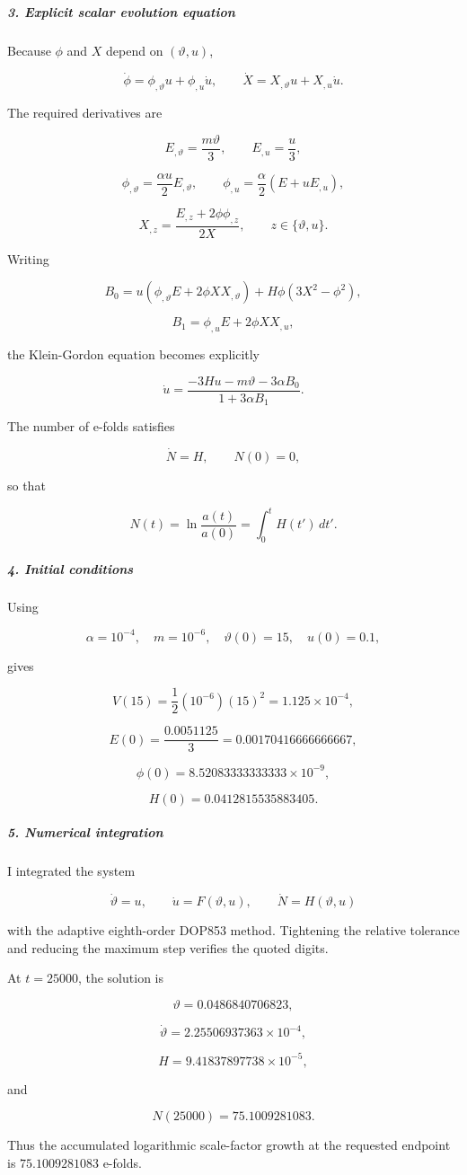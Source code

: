 \subparagraph*{3. Explicit scalar evolution equation}

Because $\phi$ and $X$ depend on $(\vartheta,u)$,

\[
\dot\phi=\phi_{,\vartheta}u+\phi_{,u}\dot u, \qquad \dot X=X_{,\vartheta}u+X_{,u}\dot u.
\]

The required derivatives are

\[
E_{,\vartheta}=\frac{m\vartheta}{3}, \qquad E_{,u}=\frac{u}{3},
\]

\[
\phi_{,\vartheta} = \frac{\alpha u}{2}E_{,\vartheta}, \qquad \phi_{,u} = \frac{\alpha}{2}\left(E+uE_{,u}\right),
\]

\[
X_{,z} = \frac{E_{,z}+2\phi\phi_{,z}}{2X}, \qquad z\in\{\vartheta,u\}.
\]

Writing

\[
B_0 = u\left(\phi_{,\vartheta}E+2\phi X X_{,\vartheta}\right) + H\phi(3X^2-\phi^2),
\]

\[
B_1 = \phi_{,u}E+2\phi X X_{,u},
\]

the Klein-Gordon equation becomes explicitly

\[
{ \dot u = \frac{-3Hu-m\vartheta-3\alpha B_0} {1+3\alpha B_1} }.
\]

The number of e-folds satisfies

\[
\dot N=H, \qquad N(0)=0,
\]

so that

\[
N(t)=\ln\frac{a(t)}{a(0)} =\int_0^t H(t')\,dt'.
\]

\subparagraph*{4. Initial conditions}

Using

\[
\alpha=10^{-4},\quad m=10^{-6},\quad \vartheta(0)=15,\quad u(0)=0.1,
\]

gives

\[
V(15)=\frac12(10^{-6})(15)^2 =1.125\times10^{-4},
\]

\[
E(0) = \frac{0.0051125}{3} = 0.00170416666666667,
\]

\[
\phi(0) = 8.52083333333333\times10^{-9},
\]

\[
H(0) = 0.0412815535883405.
\]

\subparagraph*{5. Numerical integration}

I integrated the system

\[
\dot\vartheta=u,\qquad \dot u=F(\vartheta,u),\qquad \dot N=H(\vartheta,u)
\]

with the adaptive eighth-order DOP853 method. Tightening the relative tolerance and reducing the maximum step verifies the quoted digits.

At $t=25000$, the solution is

\[
\vartheta=0.0486840706823,
\]

\[
\dot\vartheta = 2.25506937363\times10^{-4},
\]

\[
H = 9.41837897738\times10^{-5},
\]

and

\[
N(25000) = 75.1009281083.
\]

Thus the accumulated logarithmic scale-factor growth at the requested endpoint is $75.1009281083$ e-folds.
